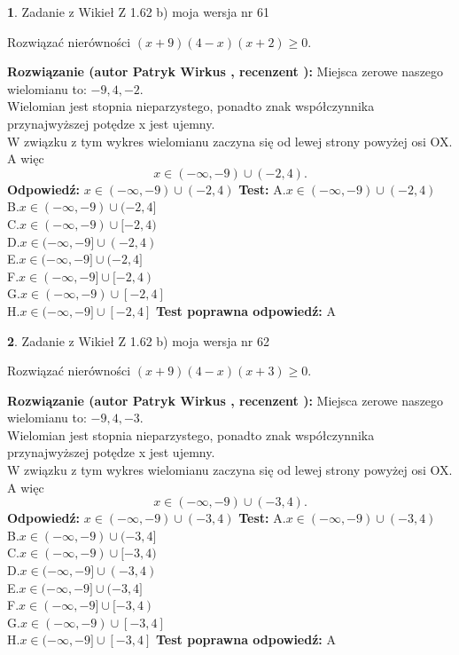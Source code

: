 \documentclass[12pt, a4paper]{article}
\theoremstyle{definition} %
\newtheorem{zad}{}
\newcommand{\zadStart}[1]{\begin{zad}#1\newline}
\newcommand{\zadStop}{\end{zad}}
\newcommand{\rozwStart}[2]{\noindent \textbf{Rozwiązanie (autor #1 , recenzent #2): }\newline}
\newcommand{\rozwStop}{\newline}
\newcommand{\odpStart}{\noindent \textbf{Odpowiedź:}\newline}
\newcommand{\odpStop}{\newline}
\newcommand{\testStart}{\noindent \textbf{Test:}\newline}
\newcommand{\testStop}{\newline}
\newcommand{\kluczStart}{\noindent \textbf{Test poprawna odpowiedź:}\newline}
\newcommand{\kluczStop}{\newline}
\begin{document}
\zadStart{Zadanie z Wikieł Z 1.62 b) moja wersja nr 61}

Rozwiązać nierówności $(x+9)(4-x)(x+2)\ge0$.
\zadStop
\rozwStart{Patryk Wirkus}{}
Miejsca zerowe naszego wielomianu to: $-9, 4, -2$.\\
Wielomian jest stopnia nieparzystego, ponadto znak współczynnika przy\linebreak najwyższej potędze x jest ujemny.\\ W związku z tym wykres wielomianu zaczyna się od lewej strony powyżej osi OX. A więc $$x \in (-\infty,-9) \cup (-2,4).$$
\rozwStop
\odpStart
$x \in (-\infty,-9) \cup (-2,4)$
\odpStop
\testStart
A.$x \in (-\infty,-9) \cup (-2,4)$\\
B.$x \in (-\infty,-9) \cup (-2,4]$\\
C.$x \in (-\infty,-9) \cup [-2,4)$\\
D.$x \in (-\infty,-9] \cup (-2,4)$\\
E.$x \in (-\infty,-9] \cup (-2,4]$\\
F.$x \in (-\infty,-9] \cup [-2,4)$\\
G.$x \in (-\infty,-9) \cup [-2,4]$\\
H.$x \in (-\infty,-9] \cup [-2,4]$
\testStop
\kluczStart
A
\kluczStop



\zadStart{Zadanie z Wikieł Z 1.62 b) moja wersja nr 62}

Rozwiązać nierówności $(x+9)(4-x)(x+3)\ge0$.
\zadStop
\rozwStart{Patryk Wirkus}{}
Miejsca zerowe naszego wielomianu to: $-9, 4, -3$.\\
Wielomian jest stopnia nieparzystego, ponadto znak współczynnika przy\linebreak najwyższej potędze x jest ujemny.\\ W związku z tym wykres wielomianu zaczyna się od lewej strony powyżej osi OX. A więc $$x \in (-\infty,-9) \cup (-3,4).$$
\rozwStop
\odpStart
$x \in (-\infty,-9) \cup (-3,4)$
\odpStop
\testStart
A.$x \in (-\infty,-9) \cup (-3,4)$\\
B.$x \in (-\infty,-9) \cup (-3,4]$\\
C.$x \in (-\infty,-9) \cup [-3,4)$\\
D.$x \in (-\infty,-9] \cup (-3,4)$\\
E.$x \in (-\infty,-9] \cup (-3,4]$\\
F.$x \in (-\infty,-9] \cup [-3,4)$\\
G.$x \in (-\infty,-9) \cup [-3,4]$\\
H.$x \in (-\infty,-9] \cup [-3,4]$
\testStop
\kluczStart
A
\kluczStop
\end{document}
